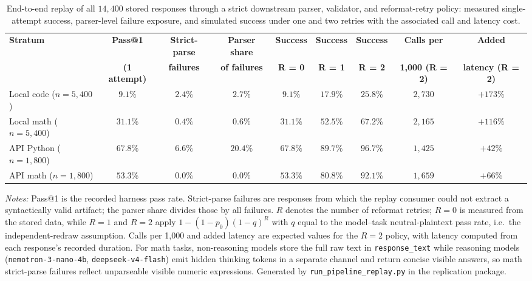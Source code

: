 \documentclass[a4paper,fleqn]{cas-sc}
\begin{document}
\begin{table}[htbp]
\centering
\caption{End-to-end replay of all $14{,}400$ stored responses through a strict downstream parser, validator, and reformat-retry policy: measured single-attempt success, parser-level failure exposure, and simulated success under one and two retries with the associated call and latency cost.}\label{tab:pipeline-replay}
\footnotesize
\setlength{\tabcolsep}{3pt}
\begin{tabular}{@{}lcccccccc@{}}
\toprule
\textbf{Stratum} & \textbf{Pass@1} & \textbf{Strict-parse} & \textbf{Parser share} & \textbf{Success} & \textbf{Success} & \textbf{Success} & \textbf{Calls per} & \textbf{Added} \\
 & \textbf{(1 attempt)} & \textbf{failures} & \textbf{of failures} & \textbf{R = 0} & \textbf{R = 1} & \textbf{R = 2} & \textbf{1,000 (R = 2)} & \textbf{latency (R = 2)} \\
\midrule
Local code ($n = 5{,}400$) & $9.1\%$ & $2.4\%$ & $2.7\%$ & $9.1\%$ & $17.9\%$ & $25.8\%$ & $2{,}730$ & $+173\%$ \\
Local math ($n = 5{,}400$) & $31.1\%$ & $0.4\%$ & $0.6\%$ & $31.1\%$ & $52.5\%$ & $67.2\%$ & $2{,}165$ & $+116\%$ \\
API Python ($n = 1{,}800$) & $67.8\%$ & $6.6\%$ & $20.4\%$ & $67.8\%$ & $89.7\%$ & $96.7\%$ & $1{,}425$ & $+42\%$ \\
API math ($n = 1{,}800$) & $53.3\%$ & $0.0\%$ & $0.0\%$ & $53.3\%$ & $80.8\%$ & $92.1\%$ & $1{,}659$ & $+66\%$ \\
\bottomrule
\end{tabular}

\vspace{2pt}
\begin{minipage}{\linewidth}
\footnotesize
\sloppy
\textit{Notes:} Pass@1 is the recorded harness pass rate. Strict-parse failures are responses from which the replay consumer could not extract a syntactically valid artifact; the parser share divides those by all failures. $R$ denotes the number of reformat retries; $R = 0$ is measured from the stored data, while $R = 1$ and $R = 2$ apply $1 - (1 - p_0)(1 - q)^R$ with $q$ equal to the model--task neutral-plaintext pass rate, i.e.\ the independent-redraw assumption. Calls per 1,000 and added latency are expected values for the $R = 2$ policy, with latency computed from each response's recorded duration. For math tasks, non-reasoning models store the full raw text in \texttt{response\_text} while reasoning models (\texttt{nemotron-3-nano-4b}, \texttt{deepseek-v4-flash}) emit hidden thinking tokens in a separate channel and return concise visible answers, so math strict-parse failures reflect unparseable visible numeric expressions. Generated by \texttt{run\_pipeline\_replay.py} in the replication package.
\end{minipage}
\end{table}
\end{document}

